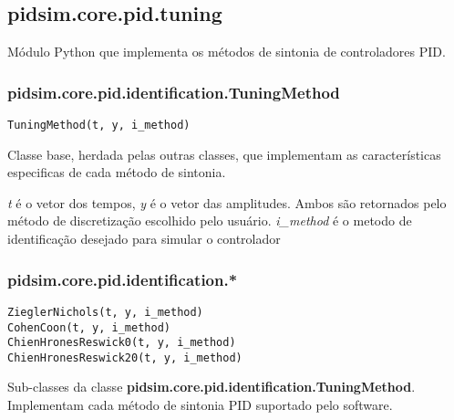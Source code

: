 \subsection{pidsim.core.pid.tuning}
    
    Módulo Python que implementa os métodos de sintonia de controladores
    \acs{PID}.
    
    \subsubsection{pidsim.core.pid.identification.TuningMethod}
        
        \begin{verbatim}
TuningMethod(t, y, i_method)
        \end{verbatim}
        
        Classe base, herdada pelas outras classes, que implementam as
        características especificas de cada método de sintonia.
        
        \textit{t} é o vetor dos tempos, \textit{y} é o vetor das amplitudes.
        Ambos são retornados pelo método de discretização escolhido pelo
        usuário. \textit{i\_method} é o metodo de identificação desejado
        para simular o controlador
    
    \subsubsection{pidsim.core.pid.identification.*}
        
        \begin{verbatim}
ZieglerNichols(t, y, i_method)
CohenCoon(t, y, i_method)
ChienHronesReswick0(t, y, i_method)
ChienHronesReswick20(t, y, i_method)
        \end{verbatim}
        
        Sub-classes da classe \textbf{pidsim.core.pid.identification.TuningMethod}.
        Implementam cada método de sintonia \acs{PID} suportado pelo software.
